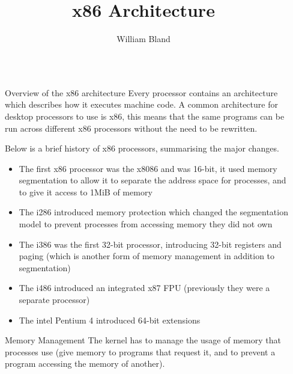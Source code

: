\documentclass[final]{beamer}
\title{x86 Architecture}
\author{William Bland}
\newlength{\sepwidth}
\newlength{\colwidth}
\newcommand{\separatorcolumn}{\begin{column}{\sepwidth}\end{column}}
\begin{document}

\begin{frame}[t]
\begin{columns}[t]
\separatorcolumn

\begin{column}{\colwidth}
  \begin{block}{Overview of the x86 architecture}
    Every processor contains an architecture which describes how it executes machine code.
    A common architecture for desktop processors to use is x86, this means that the same programs can be run across different x86 processors without the need to be rewritten.

    Below is a brief history of x86 processors, summarising the major changes.
    \begin{itemize}
      \item The first x86 processor was the x8086 and was 16-bit, it used memory segmentation to allow it to separate the address space for processes, and to give it access to 1MiB of memory
      \item The i286 introduced memory protection which changed the segmentation model to prevent processes from accessing memory they did not own
      \item The i386 was the first 32-bit processor, introducing 32-bit registers and paging (which is another form of memory management in addition to segmentation)
      \item The i486 introduced an integrated x87 FPU (previously they were a separate processor)
      \item The intel Pentium 4 introduced 64-bit extensions
    \end{itemize}
  \end{block}

  \begin{block}{Memory Management}
    The kernel has to manage the usage of memory that processes use (give memory to programs that request it, and to prevent a program accessing the memory of another).


\end{block}
\end{column}
\end{columns}
\end{frame}
\end{document}
